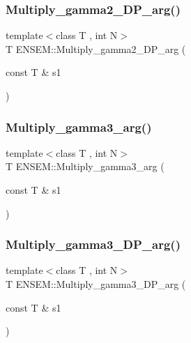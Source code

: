\mbox{\label{namespaceENSEM_af33b985b43c584e03ac68fe4ff39078c}} 
\subsubsection{\texorpdfstring{Multiply\_gamma2\_DP\_arg()}{Multiply\_gamma2\_DP\_arg()}}
{\footnotesize\ttfamily template$<$class T , int N$>$ \\
T E\+N\+S\+E\+M\+::\+Multiply\+\_\+gamma2\+\_\+\+D\+P\+\_\+arg (\begin{DoxyParamCaption}\item[{const T \&}]{s1 }\end{DoxyParamCaption})\hspace{0.3cm}{\ttfamily [inline]}}

\mbox{\label{namespaceENSEM_a7c6afb65951edae0d204cbe21535a2a5}} 
\subsubsection{\texorpdfstring{Multiply\_gamma3\_arg()}{Multiply\_gamma3\_arg()}}
{\footnotesize\ttfamily template$<$class T , int N$>$ \\
T E\+N\+S\+E\+M\+::\+Multiply\+\_\+gamma3\+\_\+arg (\begin{DoxyParamCaption}\item[{const T \&}]{s1 }\end{DoxyParamCaption})\hspace{0.3cm}{\ttfamily [inline]}}

\mbox{\label{namespaceENSEM_adac24f5430c26eab09779f3718806256}} 
\subsubsection{\texorpdfstring{Multiply\_gamma3\_DP\_arg()}{Multiply\_gamma3\_DP\_arg()}}
{\footnotesize\ttfamily template$<$class T , int N$>$ \\
T E\+N\+S\+E\+M\+::\+Multiply\+\_\+gamma3\+\_\+\+D\+P\+\_\+arg (\begin{DoxyParamCaption}\item[{const T \&}]{s1 }\end{DoxyParamCaption})\hspace{0.3cm}{\ttfamily [inline]}}

